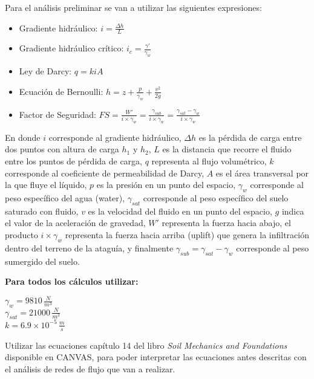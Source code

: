 \documentclass{article} %
\begin{document}
\newpage

Para el análisis preliminar se van a utilizar las siguientes expresiones:

\begin{itemize}
    \item Gradiente hidráulico: $i = \frac{\Delta h}{L}$
    \item Gradiente hidráulico crítico: $i_c = \frac{\gamma'}{\gamma_w}$
    \item Ley de Darcy: $q = kiA$
    \item Ecuación de Bernoulli: $h = z + \frac{p}{\gamma_w} + \frac{v^2}{2g}$
    \item Factor de Seguridad: $FS = \frac{W'}{i \times \gamma_w} = \frac{\gamma_{sub}}{i \times \gamma_w} = \frac{\gamma_{sat} - \gamma_w}{i \times \gamma_w}$\\
\end{itemize}

En donde $i$ corresponde al gradiente hidráulico, $\Delta h$ es la pérdida de carga entre dos puntos con altura de carga $h_1$ y $h_2$, $L$ es la distancia que recorre el fluido entre los puntos de pérdida de carga, $q$ representa al flujo volumétrico, $k$ corresponde al coeficiente de permeabilidad de Darcy, $A$ es el área transversal por la que fluye el líquido, $p$ es la presión en un punto del espacio, $\gamma_w$ corresponde al peso específico del agua (water), $\gamma_{sat}$ corresponde al peso específico del suelo saturado con fluido, $v$ es la velocidad del fluido en un punto del espacio, $g$ indica el valor de la aceleración de gravedad, $W'$ representa la fuerza hacia abajo, el producto $i \times \gamma_w$ representa la fuerza hacia arriba (uplift) que genera la infiltración dentro del terreno de la ataguía, y finalmente $\gamma_{sub} = \gamma_{sat} - \gamma_w$ corresponde al peso sumergido del suelo.

\textbf{Para todos los cálculos utilizar:}

\begin{flushleft}
    $\gamma_w = 9810 \, \frac{N}{m^3}$ \\
    $\gamma_{sat} = 21000 \, \frac{N}{m^3}$ \\
    $k = 6.9 \times 10^{-5} \, \frac{m}{s}$ \\
\end{flushleft}

Utilizar las ecuaciones capítulo 14 del libro \textit{Soil Mechanics and Foundations} disponible en CANVAS, para poder interpretar las ecuaciones antes descritas con el análisis de redes de flujo que van a realizar.
\end{document}
